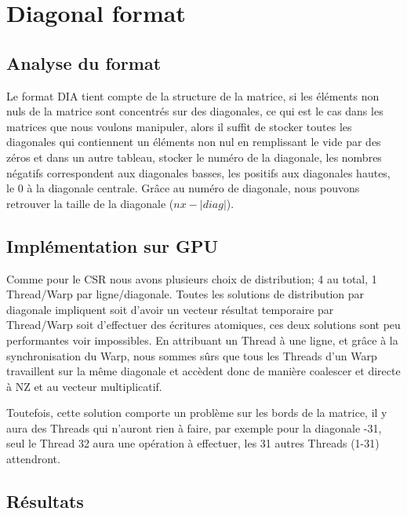 \documentclass[a4paper,11pt]{report}
\begin{document}
 \section[DIA : Diagonal format]{Diagonal format}
  \subsection{Analyse du format}
  
   Le format DIA tient compte de la structure de la matrice, si les
   éléments non nuls de la matrice sont concentrés sur des
   diagonales, ce qui est le cas dans les matrices que nous voulons
   manipuler, alors il suffit de stocker toutes les diagonales qui
   contiennent un éléments non nul en remplissant le vide par des zéros et
   dans un autre tableau, stocker le numéro de la diagonale, les
   nombres négatifs correspondent aux diagonales basses, les positifs
   aux diagonales hautes, le 0 à la diagonale centrale. Grâce au numéro
   de diagonale, nous pouvons retrouver la taille de la
   diagonale ($nx-|diag|$).

  \subsection{Implémentation sur GPU}
   Comme pour le CSR nous avons plusieurs choix de distribution; 4
   au total, 1 Thread/Warp par ligne/diagonale. Toutes les solutions
   de distribution par diagonale impliquent soit d'avoir un vecteur
   résultat temporaire par Thread/Warp soit d'effectuer des écritures
   atomiques, ces deux solutions sont peu performantes voir
   impossibles. En attribuant un Thread à une ligne, et grâce à la
   synchronisation du Warp, nous sommes sûrs que tous les Threads d'un Warp
   travaillent sur la même diagonale et accèdent donc de manière
   coalescer et directe à NZ et au vecteur multiplicatif.
   
   
   Toutefois, cette
   solution comporte un problème sur les bords de la matrice, il y
   aura des Threads qui n'auront rien à faire, par exemple pour la
   diagonale -31, seul le Thread 32 aura une opération à effectuer,
   les 31 autres Threads (1-31) attendront.

  \subsection{Résultats}
    
\end{document}
